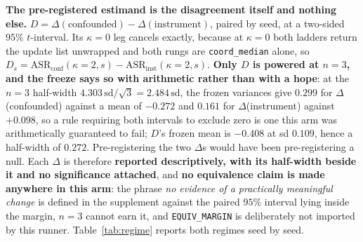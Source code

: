\documentclass{article}
\begin{document}
\textbf{The pre-registered estimand is the disagreement itself and nothing else.} $D = \Delta(\text{confounded}) - \Delta(\text{instrument})$, paired by seed, at a two-sided $95\%$ $t$-interval. Its $\kappa{=}0$ leg cancels exactly, because at $\kappa{=}0$ both ladders return the update list unwrapped and both rungs are \texttt{coord\_median} alone, so $D_s = \mathrm{ASR}_{\mathrm{conf}}(\kappa{=}2,s) - \mathrm{ASR}_{\mathrm{inst}}(\kappa{=}2,s)$. \textbf{Only $D$ is powered at $n{=}3$, and the freeze says so with arithmetic rather than with a hope}: at the $n{=}3$ half-width $4.303\,\mathrm{sd}/\sqrt{3} = 2.484\,\mathrm{sd}$, the frozen variances give $0.299$ for $\Delta$(confounded) against a mean of $-0.272$ and $0.161$ for $\Delta$(instrument) against $+0.098$, so a rule requiring both intervals to exclude zero is one this arm was arithmetically guaranteed to fail; $D$'s frozen mean is $-0.408$ at sd $0.109$, hence a half-width of $0.272$. Pre-registering the two $\Delta$s would have been pre-registering a null. Each $\Delta$ is therefore \textbf{reported descriptively, with its half-width beside it and no significance attached}, and \textbf{no equivalence claim is made anywhere in this arm}: the phrase \emph{no evidence of a practically meaningful change} is defined in the supplement against the paired $95\%$ interval lying inside the margin, $n{=}3$ cannot earn it, and \texttt{EQUIV\_MARGIN} is deliberately not imported by this runner. Table~\ref{tab:regime} reports both regimes seed by seed.
\end{document}
